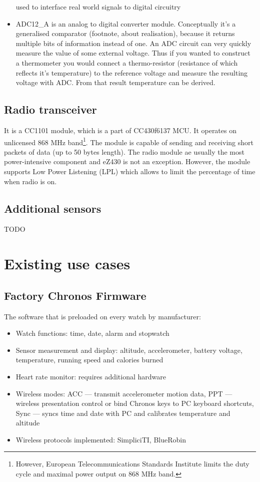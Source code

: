 \begin{itemize}
     used to interface real world signals to digital circuitry
 \item ADC12\_A is an analog to digital converter module. Conceptually
     it's a generalised comparator (footnote, about realisation),
     because it returns multiple bits of information instead of one.
     An ADC circuit can very quickly measure the value of some
     external voltage. Thus if you wanted to construct a thermometer
     you would connect a thermo-resistor (resistance of which reflects
     it's temperature) to the reference voltage and measure the
     resulting voltage with ADC. From that result temperature can be
     derived.
\end{itemize}

\subsection{Radio transceiver}

It is a CC1101 module, which is a part of CC430f6137 MCU.
It operates on unlicensed 868 MHz band\footnote{However, European Telecommunications Standards Institute limits the duty cycle and maximal power output on 868 MHz band.}.
The module is capable of sending and receiving short packets of data (up to 50 bytes length).
The radio module ae usually the most power-intensive component and eZ430 is not an exception.
However, the module supports Low Power Listening (LPL) which allows to limit the percentage of time when radio is on.

\subsection{Additional sensors}

TODO 

\section{Existing use cases}

\subsection{Factory Chronos Firmware}

The software that is preloaded on every watch by manufacturer:
\begin{itemize}
  \item Watch functions: time, date, alarm and stopwatch
  \item Sensor measurement and display: altitude, accelerometer, battery voltage, temperature, running speed and calories burned
  \item Heart rate monitor: requires additional hardware
  \item Wireless modes: ACC --- transmit accelerometer motion data, PPT --- wireless presentation control or bind Chronos keys to PC keyboard shortcuts, Sync --- syncs time and date with PC and calibrates temperature and altitude
  \item Wireless protocols implemented: SimpliciTI, BlueRobin
\end{itemize}

